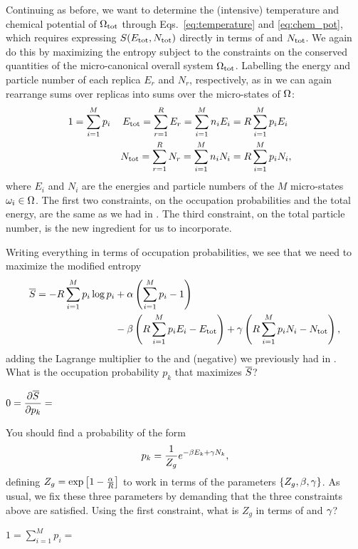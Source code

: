 Continuing as before, we want to determine the (intensive) temperature and chemical potential of $\Omega_{\text{tot}}$ through Eqs.~\ref{eq:temperature} and \ref{eq:chem_pot}, which requires expressing $S(E_{\text{tot}}, N_{\text{tot}})$ directly in terms of \Etot and $N_{\text{tot}}$.
We again do this by maximizing the entropy subject to the constraints on the conserved quantities of the micro-canonical overall system $\Omega_{\text{tot}}$.
Labelling the energy and particle number of each replica $E_r$ and $N_r$, respectively, as in  we can again rearrange sums over replicas into sums over the micro-states of $\Omega$:
\begin{align}
  1 & = \sum_{i = 1}^M p_i & E_{\text{tot}} = \sum_{r = 1}^R E_r = \sum_{i = 1}^M n_i E_i & = R \sum_{i = 1}^M p_i E_i \cr
    &                      & N_{\text{tot}} = \sum_{r = 1}^R N_r = \sum_{i = 1}^M n_i N_i & = R \sum_{i = 1}^M p_i N_i, \label{eq:grand_constraint}
\end{align}
where $E_i$ and $N_i$ are the energies and particle numbers of the $M$ micro-states $\omega_i \in \Omega$.
The first two constraints, on the occupation probabilities and the total energy, are the same as we had in .
The third constraint, on the total particle number, is the new ingredient for us to incorporate.

Writing everything in terms of occupation probabilities, we see that we need to maximize the modified entropy
\begin{align*}
  \overline S = -R \sum_{i = 1}^M p_i \log p_i & + \alpha\left(\sum_{i = 1}^M p_i - 1\right) \\
                                         & - \beta\left(R \sum_{i = 1}^M p_i E_i - E_{\text{tot}}\right) + \gamma\left(R \sum_{i = 1}^M p_i N_i - N_{\text{tot}}\right),
\end{align*}
adding the Lagrange multiplier \ga to the \al and (negative) \be we previously had in .
What is the occupation probability $p_k$ that maximizes $\overline S$?
\begin{mdframed}
  $\displaystyle 0 = \frac{\partial \overline S}{\partial p_k} = $ \\[170 pt] %
\end{mdframed}

You should find a probability of the form
\begin{equation}
  \label{eq:grand_Lagrange}
  p_k = \frac{1}{Z_g} e^{-\beta E_k + \gamma N_k},
\end{equation}
defining $Z_g = \exp\left[1 - \frac{\alpha}{R}\right]$ to work in terms of the parameters $\left\{Z_g, \beta, \gamma\right\}$.
As usual, we fix these three parameters by demanding that the three constraints above are satisfied.
Using the first constraint, what is $Z_g$ in terms of \be and $\gamma$?
\begin{mdframed}
  $\displaystyle 1 = \sum_{i = 1}^M p_i = $ \\[50 pt]
\end{mdframed}

